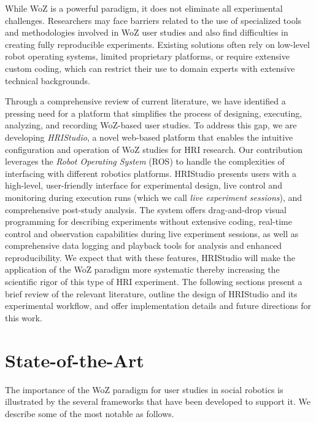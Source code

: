 \documentclass[letterpaper, 10 pt, conference]{ieeeconf}
\begin{document}
While WoZ is a powerful paradigm, it does not eliminate all experimental challenges. Researchers may face barriers related to the use of specialized tools and methodologies involved in WoZ user studies and also find difficulties in creating fully reproducible experiments. Existing solutions often rely on low-level robot operating systems, limited proprietary platforms, or require extensive custom coding, which can restrict their use to domain experts with extensive technical backgrounds.

Through a comprehensive review of current literature, we have identified a pressing need for a platform that simplifies the process of designing, executing, analyzing, and recording WoZ-based user studies. To address this gap, we are developing \emph{HRIStudio},  a novel web-based platform that enables the intuitive configuration and operation of WoZ studies for HRI research. Our contribution leverages the \emph{Robot Operating System} (ROS) to handle the complexities of interfacing with different robotics platforms. HRIStudio presents users with a high-level, user-friendly interface for experimental design, live control and monitoring during execution runs (which we call \emph{live experiment sessions}), and comprehensive post-study analysis. The system offers drag-and-drop visual programming for describing experiments without extensive coding, real-time control and observation capabilities during live experiment sessions, as well as comprehensive data logging and playback tools for analysis and enhanced reproducibility. We expect that with these features, HRIStudio will make the application of the  WoZ paradigm more systematic thereby increasing the scientific rigor of this type of HRI experiment. The following sections present a brief review of the relevant literature, outline the design of HRIStudio and its experimental workflow, and offer implementation details and future directions for this work.

\section{State-of-the-Art}

The importance of the WoZ paradigm for user studies in social robotics is illustrated by the several frameworks that have been developed to support it. We describe some of the most notable as follows.
\end{document}
